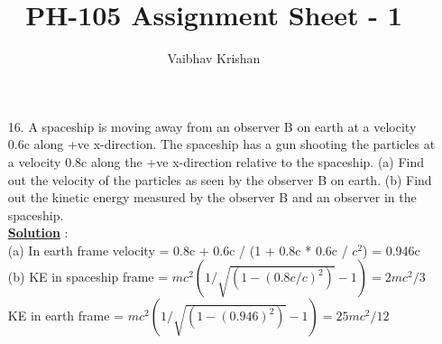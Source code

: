 \documentclass[10pt, a4paper]{article}
\begin{document}
\title{PH-105 Assignment Sheet - 1}
\author{Vaibhav Krishan}
\date{}
\maketitle
\begin{enumerate}
\item[16.]{A spaceship is moving away from an observer B on earth at a velocity 0.6c along +ve x-direction. The spaceship has a gun shooting the particles at a velocity 0.8c along the +ve x-direction relative to the spaceship. (a) Find out the velocity of the particles as seen by the observer B on earth. (b) Find out the kinetic energy measured by the observer B and an observer in the spaceship.\\


{\underline {\bf Solution}} : \\
(a) In earth frame velocity = 0.8c + 0.6c / (1 + 0.8c * 0.6c / \begin{math} c^2 \end{math}) = 0.946c\\
(b) KE in spaceship frame = \begin{math} mc^2 (1 / \sqrt{(1 - (0.8c/c)^2)} - 1) = 2mc^2 / 3 \end{math}\\
KE in earth frame = \begin{math} mc^2 (1 / \sqrt{(1 - (0.946)^2)} - 1) = 25 mc^2 /12 \end{math}\\
}
\end{enumerate}
\end{document}
